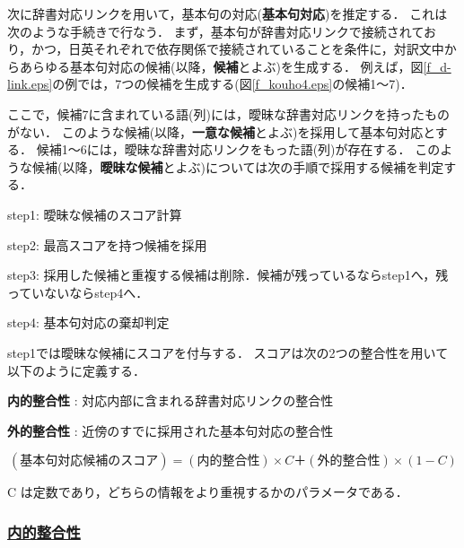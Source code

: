 次に辞書対応リンクを用いて，基本句の対応({\bf 基本句対応})を推定する．
これは次のような手続きで行なう．
まず，基本句が辞書対応リンクで接続されており，かつ，日英それぞれで依存関係で接続されていることを条件に，対訳文中からあらゆる基本句対応の候補(以降，{\bf 候補}とよぶ)を生成する．
例えば，図\ref{f_d-link.eps}の例では，7つの候補を生成する(図\ref{f_kouho4.eps}の候補1〜7)．

ここで，候補7に含まれている語(列)には，曖昧な辞書対応リンクを持ったものがない．
このような候補(以降，{\bf 一意な候補}とよぶ)を採用して基本句対応とする．
候補1〜6には，曖昧な辞書対応リンクをもった語(列)が存在する．
このような候補(以降，{\bf 曖昧な候補}とよぶ)については次の手順で採用する候補を判定する．

\vspace{1ex}
\vspace{1ex}
\begin{description}
\item step1: 曖昧な候補のスコア計算
\item step2: 最高スコアを持つ候補を採用
\item step3: 採用した候補と重複する候補は削除．候補が残っているならstep1へ，残っていないならstep4へ．
\item step4: 基本句対応の棄却判定
\end{description}
\vspace{1ex}
\vspace{1ex}

step1では曖昧な候補にスコアを付与する．
スコアは次の2つの整合性を用いて以下のように定義する．


\vspace{1ex}
\begin{description}
\item {\bf 内的整合性} :  対応内部に含まれる辞書対応リンクの整合性
\item {\bf 外的整合性} :  近傍のすでに採用された基本句対応の整合性
\end{description}
\vspace{1ex}


\[
	(基本句対応候補のスコア) = (内的整合性) \times C ＋ (外的整合性) \times (1 - C)
\]

C は定数であり，どちらの情報をより重視するかのパラメータである．



\subsubsection*{\underline{内的整合性}}


